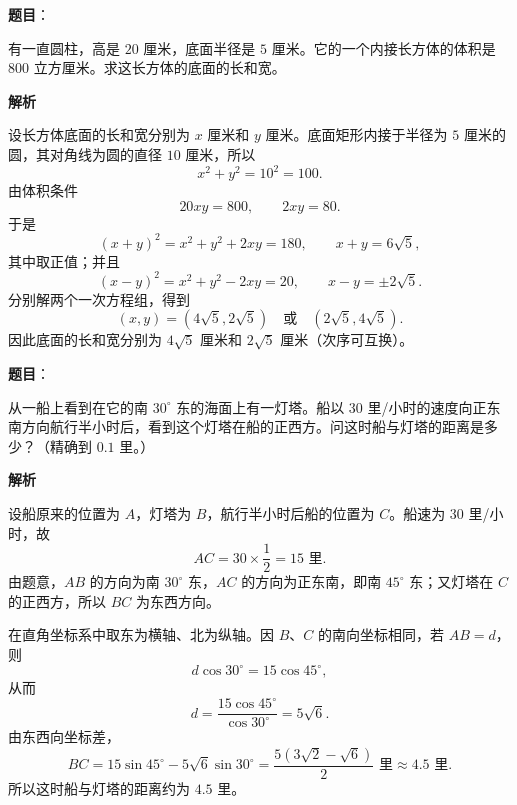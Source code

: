 \begin{answer}

\textbf{题目}：

有一直圆柱，高是 $20$ 厘米，底面半径是 $5$ 厘米。它的一个内接长方体的体积是 $800$ 立方厘米。求这长方体的底面的长和宽。

\textbf{解析}

设长方体底面的长和宽分别为 $x$ 厘米和 $y$ 厘米。底面矩形内接于半径为 $5$ 厘米的圆，其对角线为圆的直径 $10$ 厘米，所以
\[
x^2+y^2=10^2=100.
\]
由体积条件
\[
20xy=800,
\qquad 2xy=80.
\]
于是
\[
(x+y)^2=x^2+y^2+2xy=180,
\qquad x+y=6\sqrt5,
\]
其中取正值；并且
\[
(x-y)^2=x^2+y^2-2xy=20,
\qquad x-y=\pm2\sqrt5.
\]
分别解两个一次方程组，得到
\[
(x,y)=(4\sqrt5,2\sqrt5)\quad\text{或}\quad(2\sqrt5,4\sqrt5).
\]
因此底面的长和宽分别为 $4\sqrt5$ 厘米和 $2\sqrt5$ 厘米（次序可互换）。


\end{answer}
\begin{answer}

\textbf{题目}：

从一船上看到在它的南 $30^\circ$ 东的海面上有一灯塔。船以 $30$ 里/小时的速度向正东南方向航行半小时后，看到这个灯塔在船的正西方。问这时船与灯塔的距离是多少？（精确到 $0.1$ 里。）

\textbf{解析}
\nopagebreak[4]
\begin{center}\end{center}
\nopagebreak[4]
设船原来的位置为 $A$，灯塔为 $B$，航行半小时后船的位置为 $C$。船速为 $30$ 里/小时，故
\[
AC=30\times\frac12=15\text{ 里}.
\]
由题意，$AB$ 的方向为南 $30^\circ$ 东，$AC$ 的方向为正东南，即南 $45^\circ$ 东；又灯塔在 $C$ 的正西方，所以 $BC$ 为东西方向。

在直角坐标系中取东为横轴、北为纵轴。因 $B$、$C$ 的南向坐标相同，若 $AB=d$，则
\[
d\cos30^\circ=15\cos45^\circ,
\]
从而
\[
d=\frac{15\cos45^\circ}{\cos30^\circ}=5\sqrt6.
\]
由东西向坐标差，
\[
BC=15\sin45^\circ-5\sqrt6\sin30^\circ
 =\frac{5(3\sqrt2-\sqrt6)}{2}\text{ 里}
 \approx4.5\text{ 里}.
\]
所以这时船与灯塔的距离约为 $4.5$ 里。


\end{answer}
